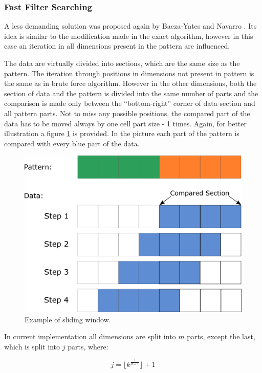 \subsubsection{Fast Filter Searching}
A less demanding solution was proposed again by Baeza-Yates and Navarro \cite{mdApproxPM}. Its idea is similar to the modification made in the exact algorithm, however in this case an iteration in all dimensions present in the pattern are influenced.

The data are virtually divided into sections, which are the same size as the pattern. The iteration through positions in dimensions not present in pattern is the same as in brute force algorithm. However in the other dimensions, both the section of data and the pattern is divided into the same number of parts and the comparison is made only between the ``bottom-right'' corner of data section and all pattern parts. Not to miss any possible positions, the compared part of the data has to be moved always by one cell part size - 1 times. Again, for better illustration a figure \ref{fig_slide} is provided. In the picture each part of the pattern is compared with every blue part of the data.

\begin{figure}
\centering
\includegraphics[width=\textwidth]{slide}
\caption{Example of sliding window.}
\label{fig_slide}
\end{figure}

In current implementation all dimensions are split into $m$ parts, except the last, which is split into $j$ parts, where:

$$j = \lfloor k^{\frac{1}{d-1}} \rfloor + 1$$

